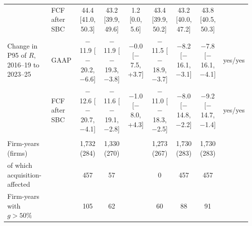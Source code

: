 \begin{table}[t]
{\begin{tabular}{llccccccc}
 & FCF after SBC & 44.4 [41.0, 50.3] & 43.2 [39.9, 49.6] & 1.2 [0.0, 5.6] & 43.4 [39.9, 50.2] & 43.2 [40.0, 47.2] & 43.8 [40.5, 50.3] &  \\
Change in P95 of $R$, 2016--19 to 2023--25 & GAAP & $-$11.9 [$-$20.2, $-$6.6] & $-$11.9 [$-$19.3, $-$3.8] & $-$0.0 [$-$7.5, +3.7] & $-$11.5 [$-$18.9, $-$3.7] & $-$8.2 [$-$16.1, $-$3.1] & $-$7.8 [$-$16.1, $-$4.1] & yes/yes \\
 & FCF after SBC & $-$12.6 [$-$20.7, $-$4.1] & $-$11.6 [$-$19.1, $-$2.8] & $-$1.0 [$-$8.0, +4.3] & $-$11.0 [$-$18.3, $-$2.5] & $-$8.0 [$-$14.8, $-$2.2] & $-$9.2 [$-$14.7, $-$1.4] & yes/yes \\
\addlinespace\multicolumn{9}{l}{\emph{C. Samples}}\\
Firm-years (firms) & & 1,732 (284) & 1,330 (270) &  & 1,273 (267) & 1,730 (283) & 1,730 (283) & \\
\quad of which acquisition-affected & & 457 & 57 &  & 0 & 457 & 457 & \\
Firm-years with $g>50\%$ & & 105 & 62 &  & 60 & 88 & 91 & \\
\bottomrule\end{tabular}}

\end{table}
